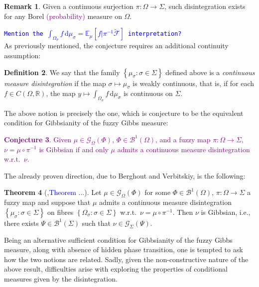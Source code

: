 \documentclass[12pt]{article}
\newcommand{\BB}{\mathscr{B}}
\renewcommand{\d}{\mathrm{d}}
\newcommand{\F}{\mathcal{F}}
\newcommand{\G}{\mathcal{G}}
\newcommand{\R}{\mathbb{R}}
\newcommand{\set}[1]{\left\{#1\right\}}
\newcommand{\ra}{\rightarrow}
\newcommand{\1}{\mathbbm{1}}
\newcommand{\5}{\vspace{0.5cm}}
\renewcommand{\tilde}{\widetilde}
\theoremstyle{definition}
\newtheorem{thm}{Theorem}[section]
\newtheorem{df}[thm]{Definition}
\newtheorem{rem}[thm]{Remark}
\newtheorem{conj}[thm]{Conjecture}
\begin{document}
\begin{rem}
Given a continuous surjection $\pi:\Omega\ra\Sigma$, such disintegration exists for any Borel \textcolor{purple}{(probability)} measure on $\Omega$.
\end{rem}

\textcolor{blue}{\texttt{Mention the $\int_{\Omega_\sigma}f\,\d\mu_\sigma=\mathbb{E}_\mu[f|\pi^{-1}\tilde{\F}]$ interpretation?}}\\

As previously mentioned, the conjecture requires an additional continuity assumption:

\begin{df}
We say that the family $\set{\mu_\sigma:\sigma\in\Sigma}$ defined above is a \textit{continuous measure disintegration} if the map $\sigma\mapsto\mu_\sigma$ is weakly continuous, that is, if for each $f\in C(\Omega,\R)$, the map $y\mapsto\int_{\Omega_\sigma}f\,\d\mu_\sigma$ is continuous on $\Sigma$.
\end{df}

The above notion is precisely the one, which is conjecture to be the equivalent condition for Gibbsianity of the fuzzy Gibbs measure:
\textcolor{purple}{
\begin{conj}
Given $\mu\in\G_\Omega(\Phi)$, $\Phi\in\BB^1(\Omega)$, and a fuzzy map $\pi:\Omega\ra\Sigma$, $\nu=\mu\circ\pi^{-1}$ is Gibbsian if and only $\mu$ admits a continuous measure disintegration w.r.t.~$\nu$.
\end{conj}}

The already proven direction, due to Berghout and Verbitskiy, is the following:
\begin{thm}[\cite{Ber},\textcolor{blue}{Theorem ...}]
Let $\mu\in\G_\Omega(\Phi)$ for some $\Phi\in\BB^1(\Omega)$, $\pi:\Omega\ra\Sigma$ a fuzzy map and suppose that $\mu$ admits a continuous measure disintegration $\set{\mu_\sigma:\sigma\in\Sigma}$ on fibres $\set{\Omega_\sigma:\sigma\in\Sigma}$ w.r.t.~$\nu=\mu\circ\pi^{-1}$. Then $\nu$ is Gibbsian, i.e., there exists $\Psi\in\BB^1(\Sigma)$ such that $\nu\in\G_\Sigma(\Psi)$.
\end{thm}

Being an alternative sufficient condition for Gibbsianity of the fuzzy Gibbs measure, along with absence of hidden phase transition, one is tempted to ask how the two notions are related. Sadly, given the non-constructive nature of the above result, difficulties arise with exploring the properties of conditional measures given by the disintegration. \\
\end{document}
